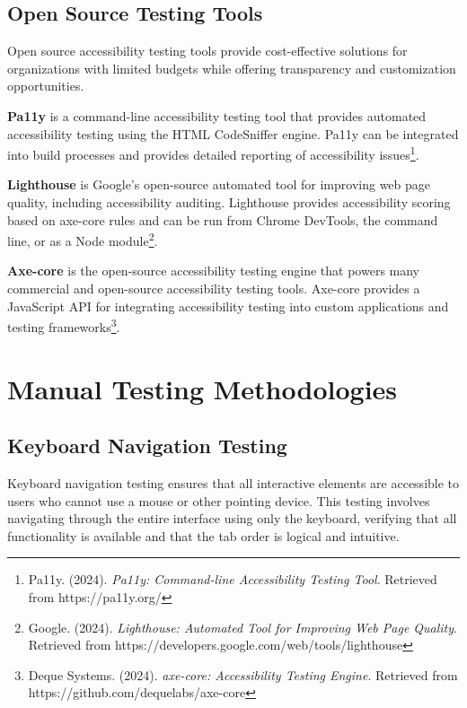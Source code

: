 \subsection{Open Source Testing Tools}

Open source accessibility testing tools provide cost-effective solutions for organizations with limited budgets while offering transparency and customization opportunities.

\textbf{Pa11y} is a command-line accessibility testing tool that provides automated accessibility testing using the HTML CodeSniffer engine. Pa11y can be integrated into build processes and provides detailed reporting of accessibility issues\footnote{Pa11y. (2024). \textit{Pa11y: Command-line Accessibility Testing Tool}. Retrieved from https://pa11y.org/}.

\textbf{Lighthouse} is Google's open-source automated tool for improving web page quality, including accessibility auditing. Lighthouse provides accessibility scoring based on axe-core rules and can be run from Chrome DevTools, the command line, or as a Node module\footnote{Google. (2024). \textit{Lighthouse: Automated Tool for Improving Web Page Quality}. Retrieved from https://developers.google.com/web/tools/lighthouse}.

\textbf{Axe-core} is the open-source accessibility testing engine that powers many commercial and open-source accessibility testing tools. Axe-core provides a JavaScript API for integrating accessibility testing into custom applications and testing frameworks\footnote{Deque Systems. (2024). \textit{axe-core: Accessibility Testing Engine}. Retrieved from https://github.com/dequelabs/axe-core}.

\section{Manual Testing Methodologies}
\label{sec:manual-methods}

\subsection{Keyboard Navigation Testing}

Keyboard navigation testing ensures that all interactive elements are accessible to users who cannot use a mouse or other pointing device. This testing involves navigating through the entire interface using only the keyboard, verifying that all functionality is available and that the tab order is logical and intuitive.


